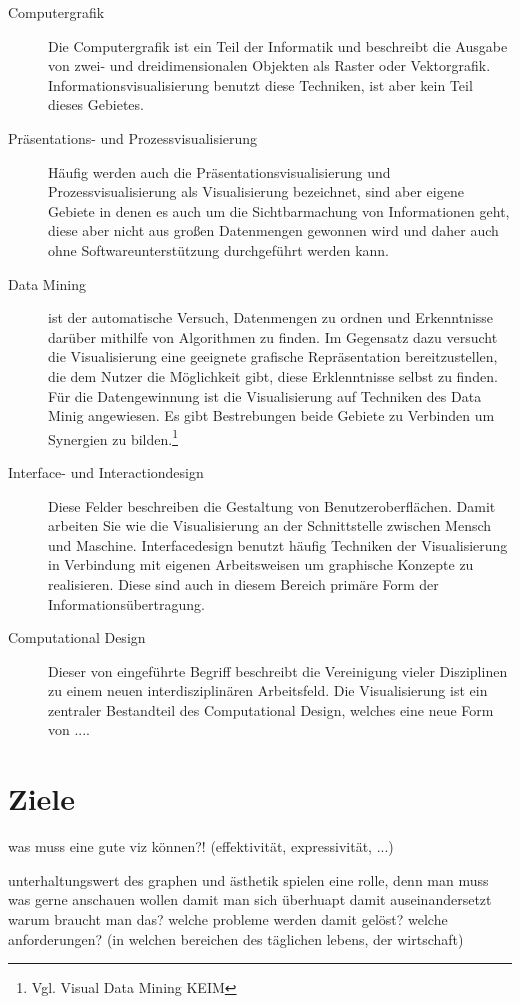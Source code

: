 \documentclass[a4paper, 12pt, DIVcalc, onepage, pdftex, headsepline, footsepline]{scrreprt}
\begin{document}
\begin{description}
\item[Computergrafik]
Die Computergrafik ist ein Teil der Informatik und beschreibt die Ausgabe von zwei- und dreidimensionalen
Objekten als Raster oder Vektorgrafik. Informationsvisualisierung benutzt diese Techniken, ist aber kein Teil
dieses Gebietes.
\item[Präsentations- und Prozessvisualisierung]
Häufig werden auch die Präsentationsvisualisierung und Prozessvisualisierung als Visualisierung bezeichnet, sind
aber eigene Gebiete in denen es auch um die Sichtbarmachung von Informationen geht, diese aber nicht aus
großen Datenmengen gewonnen wird und daher auch ohne Softwareunterstützung durchgeführt werden kann.
\item[Data Mining] ist der automatische Versuch, Datenmengen zu ordnen und Erkenntnisse darüber mithilfe
von Algorithmen zu finden. Im Gegensatz dazu versucht die Visualisierung eine geeignete grafische Repräsentation
bereitzustellen, die dem Nutzer die Möglichkeit gibt, diese Erklenntnisse selbst zu finden. Für die Datengewinnung
ist die Visualisierung auf Techniken des Data Minig angewiesen. Es gibt Bestrebungen beide Gebiete zu
Verbinden um Synergien zu bilden.\footnote{Vgl. Visual Data Mining KEIM}
\item[Interface- und Interactiondesign]
Diese Felder beschreiben die Gestaltung von Benutzeroberflächen. Damit arbeiten Sie wie die Visualisierung an
der Schnittstelle zwischen Mensch und Maschine. Interfacedesign benutzt häufig Techniken der Visualisierung
in Verbindung mit eigenen Arbeitsweisen um graphische Konzepte zu realisieren. Diese sind auch in diesem
Bereich primäre Form der Informationsübertragung.
\item[Computational Design]
Dieser von \citep{BenFry} eingeführte Begriff beschreibt die Vereinigung vieler Disziplinen zu einem neuen
interdisziplinären Arbeitsfeld. Die Visualisierung ist ein zentraler Bestandteil des Computational Design,
welches eine neue Form von ....
\end{description}

\section{Ziele}
\label{sec:Ziele}
was muss eine gute viz können?! (effektivität, expressivität, ...)

unterhaltungswert des graphen und ästhetik spielen eine rolle, denn man muss was gerne anschauen wollen damit man sich überhuapt damit auseinandersetzt
warum braucht man das? welche probleme werden damit gelöst?
welche anforderungen? (in welchen bereichen des täglichen lebens, der wirtschaft)
\end{document}
